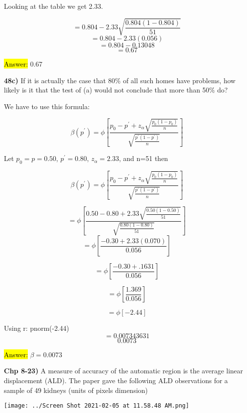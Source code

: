 \documentclass{article}
\begin{document}
Looking at the table we get 2.33.

\vspace{2mm}

$$=0.804-2.33\sqrt{\frac{0.804(1-0.804)}{51}}$$
$$=0.804-2.33(0.056)$$
$$=0.804-0.13048$$
$$=0.67$$

\vspace{2mm}

\hl{Answer:} 0.67




\vspace{5mm}

\textbf{48c)} If it is actually the case that 80\% of all such homes have problems, how likely is it that the test of (a) would not conclude that more than 50\% do?

\vspace{2mm}

We have to use this formula: 

$$\beta(p^{'})=\phi[\frac{p_{0}-p^{'}+z_{\alpha}\sqrt{\frac{p_{0}(1-p_{0})}{n}}}{\sqrt{\frac{p^{'}(1-p^{'})}{n}}}]$$

Let $p_{0}=p=0.50$, $p^{'}=0.80$, $z_{\alpha}=2.33$, and n=51 then

$$\beta(p^{'})=\phi[\frac{p_{0}-p^{'}+z_{\alpha}\sqrt{\frac{p_{0}(1-p_{0})}{n}}}{\sqrt{\frac{p^{'}(1-p^{'})}{n}}}]$$

$$=\phi[\frac{0.50-0.80+2.33\sqrt{\frac{0.50(1-0.50)}{51}}}{\sqrt{\frac{0.80(1-0.80)}{51}}}]$$
$$=\phi[\frac{-0.30+2.33(0.070)}{0.056}]$$

$$=\phi[\frac{-0.30+.1631}{0.056}]$$

$$=\phi[\frac{1.369}{0.056}]$$

$$=\phi[-2.44]$$

Using r: pnorm(-2.44)
$$=0.007343631$$
$$0.0073$$

\vspace{2mm}

\hl{Answer:} $\beta=0.0073$


\newpage
\textbf{Chp 8-23)} A measure of accuracy of the automatic region is the average linear displacement (ALD). The paper gave the following ALD observations for a sample of 49 kidneys (units of pixels dimension)

\vspace{5mm}

\texttt{[image: ../Screen Shot 2021-02-05 at 11.58.48 AM.png]}
\end{document}
